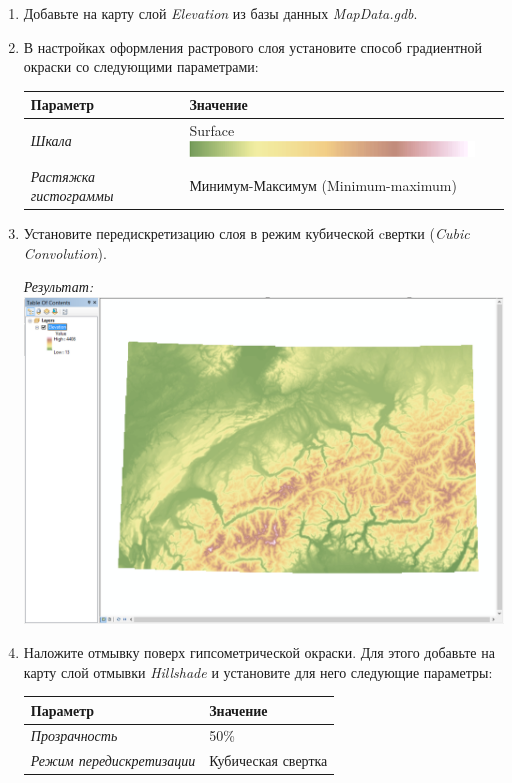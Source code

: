 \documentclass[]{book}
\theoremstyle{definition}
\theoremstyle{definition}
\theoremstyle{definition}
\theoremstyle{remark}
\begin{document}
\begin{enumerate}
\def\labelenumi{\arabic{enumi}.}
\item
  Добавьте на карту слой \emph{Elevation} из базы данных
  \emph{MapData.gdb}.
\item
  В настройках оформления растрового слоя установите способ градиентной
  окраски со следующими параметрами:

  \begin{longtable}[]{@{}ll@{}}
  \toprule
  Параметр & Значение\tabularnewline
  \midrule
  \endhead
  \emph{Шкала} & Surface
  \includegraphics{images/Ex02/image11.png}\tabularnewline
  \emph{Растяжка гистограммы} & Минимум-Максимум
  (Minimum-maximum)\tabularnewline
  \bottomrule
  \end{longtable}
\item
  Установите передискретизацию слоя в режим кубической cвертки
  (\emph{Cubic Convolution}).

  \emph{Результат:} \includegraphics{images/Ex02/image12.png}
\item
  Наложите отмывку поверх гипсометрической окраски. Для этого добавьте
  на карту слой отмывки \emph{Hillshade} и установите для него следующие
  параметры:

  \begin{longtable}[]{@{}ll@{}}
  \toprule
  Параметр & Значение\tabularnewline
  \midrule
  \endhead
  \emph{Прозрачность} & 50\%\tabularnewline
  \emph{Режим передискретизации} & Кубическая свертка\tabularnewline
  \bottomrule
  \end{longtable}


\end{enumerate}
\end{document}
